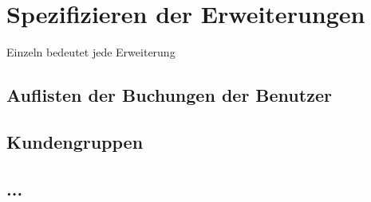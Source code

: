 \section{Spezifizieren der Erweiterungen}
Einzeln bedeutet jede Erweiterung
\subsection{Auflisten der Buchungen der Benutzer}
\subsection{Kundengruppen}
\subsection{...}

